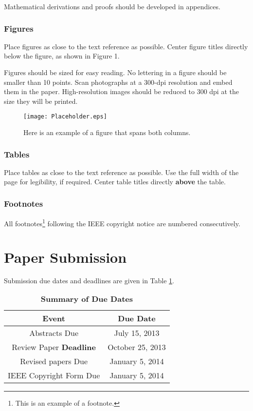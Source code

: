 \documentclass[twocolumn,letterpaper]{IEEEAerospaceCLS}  %
\begin{document}
Mathematical derivations and proofs should be developed in appendices.

\subsubsection{Figures}
Place figures as close to the text reference as possible. Center figure titles directly below the figure, as shown in Figure 1.

Figures should be sized for easy reading. No lettering in a figure should be smaller than 10 points. Scan photographs at a 300-dpi resolution and embed them in the paper. High-resolution images should be reduced to 300 dpi at the size they will be printed.

\begin{figure*}
\centering
\texttt{[image: Placeholder.eps]}
\caption{Here is an example of a figure that spans both columns.}
\label{FlowChart}
\end{figure*}

\subsubsection{Tables}
Place tables as close to the text reference as possible. Use the full width of the page for legibility, if required. Center table titles directly {\bf above} the table.

\subsubsection{Footnotes}
All footnotes\footnote{This is an example of a footnote.} following the IEEE copyright notice are numbered consecutively. 

\section{Paper Submission}
Submission due dates and deadlines are given in Table \ref{DueDates}.

\begin{table}
\renewcommand{\arraystretch}{1.3}
\caption{\bf Summary of Due Dates}
\label{DueDates}
\centering
\begin{tabular}{|c|c|}
\hline
\bfseries Event & \bfseries Due Date \\
\hline\hline
Abstracts Due               & July 15, 2013 \\
Review Paper {\bf Deadline} & October 25, 2013 \\
Revised papers Due          & January 5, 2014\\
IEEE Copyright Form Due     & January 5, 2014 \\
\hline
\end{tabular}
\end{table}
\end{document}
